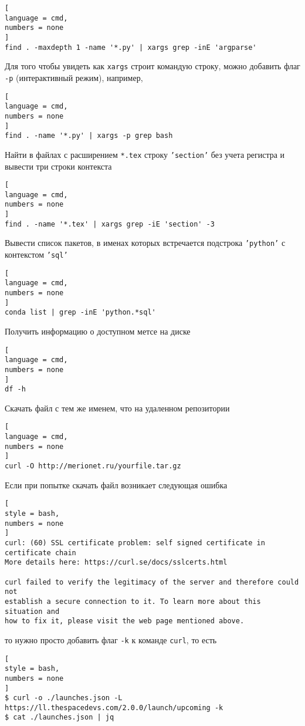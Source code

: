 \documentclass[%
	11pt,
	a4paper,
	utf8,
		]{article}
\begin{document}
\begin{lstlisting}[
language = cmd,
numbers = none
]
find . -maxdepth 1 -name '*.py' | xargs grep -inE 'argparse'
\end{lstlisting} 

Для того чтобы увидеть как \texttt{xargs} строит командую строку, можно добавить флаг \texttt{-p} (интерактивный режим), например,
\begin{lstlisting}[
language = cmd,
numbers = none
]
find . -name '*.py' | xargs -p grep bash
\end{lstlisting} 

Найти в файлах с расширением \texttt{*.tex} строку \texttt{'section'} без учета регистра и вывести три строки контекста
\begin{lstlisting}[
language = cmd,
numbers = none
]
find . -name '*.tex' | xargs grep -iE 'section' -3
\end{lstlisting}

Вывести список пакетов, в именах которых встречается подстрока \texttt{'python'} с контекстом \texttt{'sql'}
\begin{lstlisting}[
language = cmd,
numbers = none
]
conda list | grep -inE 'python.*sql'
\end{lstlisting}

Получить информацию о доступном метсе на диске
\begin{lstlisting}[
language = cmd,
numbers = none
]
df -h
\end{lstlisting}

Скачать файл с тем же именем, что на удаленном репозитории 
\begin{lstlisting}[
language = cmd,
numbers = none
]
curl -O http://merionet.ru/yourfile.tar.gz
\end{lstlisting}

Если при попытке скачать файл возникает следующая ошибка
\begin{lstlisting}[
style = bash,
numbers = none
]
curl: (60) SSL certificate problem: self signed certificate in certificate chain
More details here: https://curl.se/docs/sslcerts.html

curl failed to verify the legitimacy of the server and therefore could not
establish a secure connection to it. To learn more about this situation and
how to fix it, please visit the web page mentioned above.
\end{lstlisting}
то нужно просто добавить флаг \verb|-k| к команде \verb|curl|, то есть
\begin{lstlisting}[
style = bash,
numbers = none
]
$ curl -o ./launches.json -L https://ll.thespacedevs.com/2.0.0/launch/upcoming -k
$ cat ./launches.json | jq
\end{lstlisting}
\end{document}

